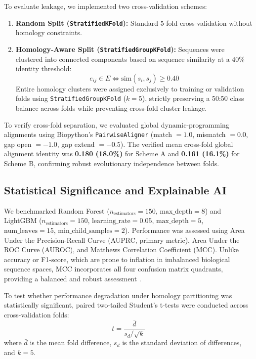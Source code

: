 \documentclass[11pt,a4paper]{article}
\begin{document}
To evaluate leakage, we implemented two cross-validation schemes:
\begin{enumerate}
    \item \textbf{Random Split (\texttt{StratifiedKFold}):} Standard 5-fold cross-validation without homology constraints.
    \item \textbf{Homology-Aware Split (\texttt{StratifiedGroupKFold}):} Sequences were clustered into connected components based on sequence similarity at a 40\% identity threshold:
    \begin{equation}
    e_{ij} \in E \iff \text{sim}(s_i, s_j) \ge 0.40
    \end{equation}
    Entire homology clusters were assigned exclusively to training or validation folds using \texttt{StratifiedGroupKFold} ($k = 5$), strictly preserving a 50:50 class balance across folds while preventing cross-fold cluster leakage.
\end{enumerate}

To verify cross-fold separation, we evaluated global dynamic-programming alignments using Biopython's \texttt{PairwiseAligner} (match $= 1.0$, mismatch $= 0.0$, gap open $= -1.0$, gap extend $= -0.5$). The verified mean cross-fold global alignment identity was \textbf{0.180 (18.0\%)} for Scheme A and \textbf{0.161 (16.1\%)} for Scheme B, confirming robust evolutionary independence between folds.

\subsection{Statistical Significance and Explainable AI}

We benchmarked Random Forest ($n_{\text{estimators}} = 150$, $\text{max\_depth} = 8$) and LightGBM ($n_{\text{estimators}} = 150$, $\text{learning\_rate} = 0.05$, $\text{max\_depth} = 5$, $\text{num\_leaves} = 15$, $\text{min\_child\_samples} = 2$). Performance was assessed using Area Under the Precision-Recall Curve (AUPRC, primary metric), Area Under the ROC Curve (AUROC), and Matthews Correlation Coefficient (MCC). Unlike accuracy or F1-score, which are prone to inflation in imbalanced biological sequence spaces, MCC incorporates all four confusion matrix quadrants, providing a balanced and robust assessment \cite{chicco2020advantages}.

To test whether performance degradation under homology partitioning was statistically significant, paired two-tailed Student's t-tests were conducted across cross-validation folds:
\begin{equation}
t = \frac{\bar{d}}{s_d / \sqrt{k}}
\end{equation}
where $\bar{d}$ is the mean fold difference, $s_d$ is the standard deviation of differences, and $k = 5$.
\end{document}
